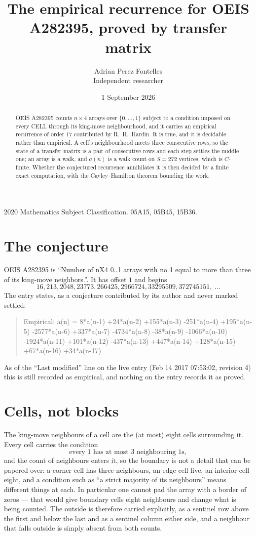 \documentclass[11pt,a4paper]{article}
\title{The empirical recurrence for OEIS A282395, proved by transfer matrix}
\author{Adrian Perez Fontelles\\ \small Independent researcher}
\date{1 September 2026}
\theoremstyle{plain}
\theoremstyle{definition}
\begin{document}
\maketitle

\begin{abstract}
OEIS A282395 counts $n\times4$ arrays over $\{0,\dots,1\}$ subject to a condition imposed on
every CELL through its king-move neighbourhood, and it carries an empirical recurrence of
order $17$ contributed by R.~H.~Hardin. It is true, and it is decidable rather than
empirical. A cell's neighbourhood meets three consecutive rows, so the state of a transfer
matrix is a pair of consecutive rows and each step settles the middle one; an array is a
walk, and $a(n)$ is a walk count on $S=272$ vertices, which is $C$-finite. Whether the
conjectured recurrence annihilates it is then decided by a finite exact computation, with the
Cayley--Hamilton theorem bounding the work.
\end{abstract}

\noindent\small 2020 Mathematics Subject Classification. 05A15, 05B45, 15B36.\normalsize

\section{The conjecture}

OEIS A282395 is ``Number of nX4 0..1 arrays with no 1 equal to more than three of its king-move neighbors.''. It has offset $1$ and begins
\[
16, 213, 2048, 23773, 266425, 2966724, 33295509, 372745151,\ \dots
\]
The entry states, as a conjecture contributed by its author and never marked settled:
\begin{quote}
Empirical: a(n) = 8*a(n-1) +24*a(n-2) +155*a(n-3) -251*a(n-4) +195*a(n-5) -2577*a(n-6) +337*a(n-7) -4734*a(n-8) -38*a(n-9) -1066*a(n-10) -1924*a(n-11) +101*a(n-12) -437*a(n-13) +447*a(n-14) +128*a(n-15) +67*a(n-16) +34*a(n-17)
\end{quote}
As of the ``Last modified'' line on the live entry (Feb 14 2017 07:53:02, revision 4) this is still
recorded as empirical, and nothing on the entry records it as proved.

\section{Cells, not blocks}

The king-move neighbours of a cell are the (at most) eight cells surrounding it. Every cell
carries the condition
\[
\text{every }1\text{ has at most }3\text{ neighbouring }1\text{s},
\]
and the count of neighbours enters it, so the boundary is not a detail that can be papered
over: a corner cell has three neighbours, an edge cell five, an interior cell eight, and a
condition such as ``a strict majority of its neighbours'' means different things at each. In
particular one cannot pad the array with a border of zeros --- that would give boundary cells
eight neighbours and change what is being counted. The outside is therefore carried
explicitly, as a sentinel row above the first and below the last and as a sentinel column
either side, and a neighbour that falls outside is simply absent from both counts.
\end{document}
